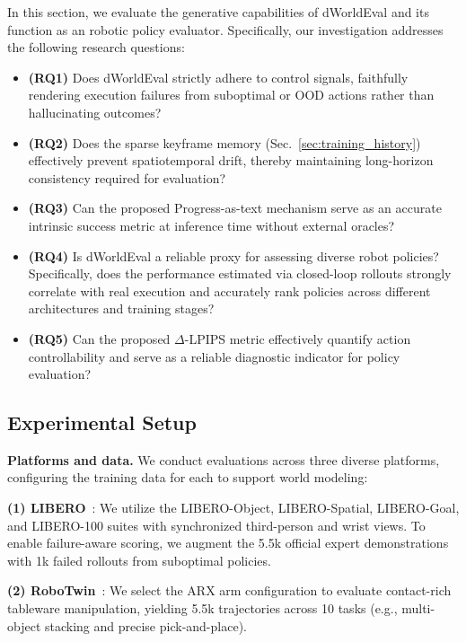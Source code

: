 In this section, we evaluate the generative capabilities of dWorldEval and its function as an robotic policy evaluator. 
Specifically, our investigation addresses the following research questions:
\begin{itemize}
    \item \textbf{(RQ1)}
    Does dWorldEval strictly adhere to control signals, faithfully rendering execution failures from suboptimal or OOD actions rather than hallucinating outcomes?

    \item \textbf{(RQ2)}
    Does the sparse keyframe memory
    (Sec.~\ref{sec:training_history}) 
    effectively prevent spatiotemporal drift, thereby maintaining long-horizon consistency required for evaluation?

    \item \textbf{(RQ3)}
    Can the proposed Progress-as-text mechanism serve as an accurate intrinsic success metric at inference time without external oracles?

    \item \textbf{(RQ4)}
    Is dWorldEval a reliable proxy for assessing diverse robot policies? Specifically, does the performance estimated via closed-loop rollouts strongly correlate with real execution and accurately rank policies across different architectures and training stages?

    \item \textbf{(RQ5)} 
    Can the proposed $\Delta$-LPIPS metric effectively quantify action controllability and serve as a reliable diagnostic indicator for policy evaluation?
\end{itemize}


\subsection{Experimental Setup}
\label{subsec:setup}

\textbf{Platforms and data.} 
We conduct evaluations across three diverse platforms, configuring the training data for each to support world modeling:

\textbf{(1) LIBERO}~\cite{liu2024libero}:
We utilize the LIBERO-Object, LIBERO-Spatial, LIBERO-Goal, and LIBERO-100 suites with synchronized third-person and wrist views.
To enable failure-aware scoring, we augment the 5.5k official expert demonstrations with 1k failed rollouts from suboptimal policies.

\textbf{(2) RoboTwin}~\cite{mu2025robotwin}:
We select the ARX arm configuration to evaluate contact-rich tableware manipulation, yielding 5.5k trajectories across 10 tasks (e.g., multi-object stacking and precise pick-and-place).

